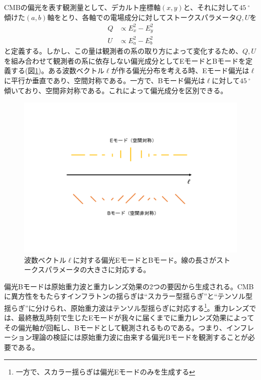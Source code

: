 CMBの偏光を表す観測量として、デカルト座標軸$(x,y)$と、それに対して$\SI{45}{^{\circ}}$傾けた$(a,b)$軸をとり、各軸での電場成分に対してストークスパラメータ$Q,U$を
\begin{align}
  Q &\propto E_{x}^{2} - E_{y}^{2} \\
  U &\propto E_{a}^{2} - E_{b}^{2}
\end{align}
と定義する。しかし、この量は観測者の系の取り方によって変化するため、$Q,U$を組み合わせて観測者の系に依存しない偏光成分としてEモードとBモードを定義する(図\ref{pol_mode})。ある波数ベクトル$\bm{\ell}$が作る偏光分布を考える時、Eモード偏光は$\bm{\ell}$に平行か垂直であり、空間対称である。一方で、Bモード偏光は$\bm{\ell}$に対して$\SI{45}{^{\circ}}$傾いており、空間非対称である。これによって偏光成分を区別できる。
\begin{figure}[htbp]
  \centering
  \includegraphics[width=0.8\columnwidth]{2_cosmology/figs/pol_mode.pdf}
  \caption{波数ベクトル$\bm{\ell}$に対する偏光EモードとBモード。線の長さがストークスパラメータの大きさに対応する。}
  \label{pol_mode}
\end{figure}

偏光Bモードは原始重力波と重力レンズ効果の2つの要因から生成される。CMBに異方性をもたらすインフラトンの揺らぎは``スカラー型揺らぎ''と``テンソル型揺らぎ''に分けられ、原始重力波はテンソル型揺らぎに対応する\footnote{一方で、スカラー揺らぎは偏光Eモードのみを生成する}。重力レンズでは、最終散乱時刻で生じたEモードが我々に届くまでに重力レンズ効果によってその偏光軸が回転し、Bモードとして観測されるものである。つまり、インフレーション理論の検証には原始重力波に由来する偏光Bモードを観測することが必要である。

